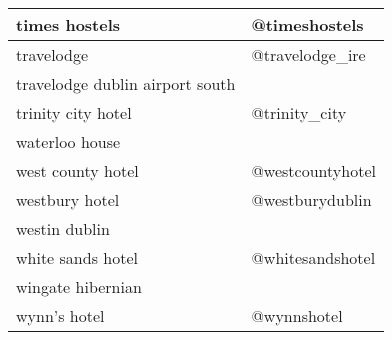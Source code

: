 \begin{table}[h!]
\begin{tabular}{|p{7cm}|p{5cm}|}
times hostels & @timeshostels \\ \hline
travelodge & @travelodge\_ire \\ \hline
travelodge dublin airport south &  \\ \hline
trinity city hotel & @trinity\_city \\ \hline
waterloo house &  \\ \hline
west county hotel & @westcountyhotel \\ \hline
westbury hotel & @westburydublin \\ \hline
westin dublin &  \\ \hline
white sands hotel & @whitesandshotel \\ \hline
wingate hibernian &  \\ \hline
wynn's hotel & @wynnshotel \\ \hline
\end{tabular}
\end{table}

